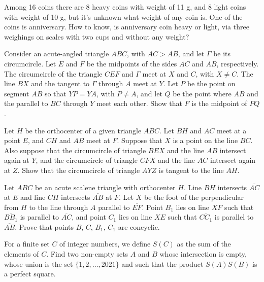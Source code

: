 \documentclass[11pt]{scrartcl}
\begin{document}
\begin{problem}[709461884323637120]
Among 16 coins there are 8 heavy coins with weight of 11 g, and 8 light coins with weight of 10 g, but it's unknown what weight of any coin is. One of the coins is anniversary. How to know, is anniversary coin heavy or light, via three weighings on scales with two cups and without any weight?
\end{problem}
\begin{problem}[7351162576557167474]
Consider an acute-angled triangle $ABC$, with $AC>AB$, and let $\Gamma$ be its circumcircle. Let $E$ and $F$ be the midpoints of the sides $AC$ and $AB$, respectively. The circumcircle of the triangle $CEF$ and $\Gamma$ meet at $X$ and $C$, with $X\neq C$. The line $BX$ and the tangent to $\Gamma$ through $A$ meet at $Y$. Let $P$ be the point on segment $AB$ so that $YP = YA$, with $P\neq A$, and let $Q$ be the point where $AB$ and the parallel to $BC$ through $Y$ meet each other. Show that $F$ is the midpoint of $PQ$.
\end{problem}
\begin{problem}[119129720704350]
Let $H$ be the orthocenter of a given triangle $ABC$. Let $BH$ and $AC$ meet at a point $E$, and $CH$ and $AB$ meet at $F$. Suppose that $X$ is a point on the line $BC$. Also suppose that the circumcircle of triangle $BEX$ and the line $AB$ intersect again at $Y$, and the circumcircle of triangle $CFX$ and the line $AC$ intersect again at $Z$.
Show that the circumcircle of triangle $AYZ$ is tangent to the line $AH$.
\end{problem}
\begin{problem}[15595788767204175]
Let \(ABC\) be an acute scalene triangle with orthocenter \(H\). Line \(BH\) intersects \(\overline{AC}\) at \(E\) and line \(CH\) intersects \(\overline{AB}\) at \(F\). Let \(X\) be the foot of the perpendicular from \(H\) to the line through \(A\) parallel to \(\overline{EF}\). Point \(B_1\) lies on line \(XF\) such that \(\overline{BB_1}\) is parallel to \(\overline{AC}\), and point \(C_1\) lies on line \(XE\) such that \(\overline{CC_1}\) is parallel to \(\overline{AB}\). Prove that points \(B\), \(C\), \(B_1\), \(C_1\) are concyclic.
\end{problem}
\begin{problem}[576014113251153]
For a finite set $C$ of integer numbers, we define $S(C)$ as the sum of the elements of $C$. Find two non-empty sets $A$ and $B$ whose intersection is empty, whose union is the set $\{1,2,\ldots, 2021\}$ and such that the product $S(A)S(B)$ is a perfect square.
\end{problem}
\end{document}
